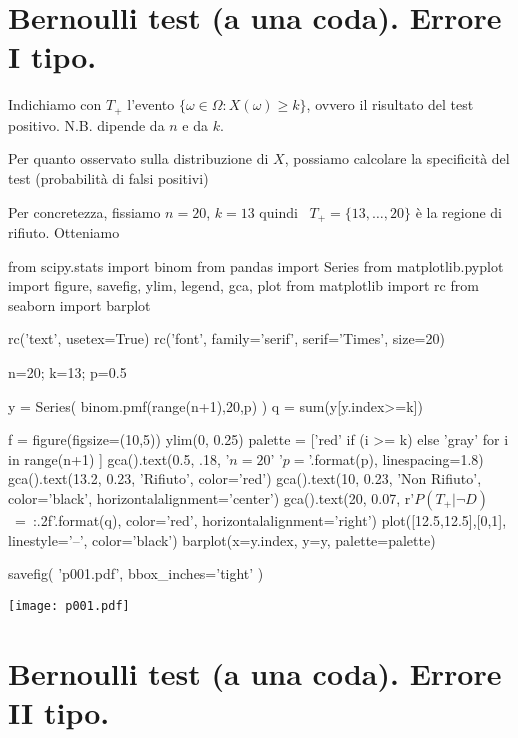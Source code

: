 \documentclass[10pt,openany]{book}
\theoremstyle{mio}
\theoremstyle{liscio}
\begin{document}
\clearpage\section{Bernoulli test (a una coda). Errore I tipo.}

Indichiamo con $T_+$ l'evento $\{\omega\in\Omega: X(\omega)\ge k\}$, ovvero il risultato del test positivo. N.B. dipende da $n$ e da $k$.

Per quanto osservato sulla distribuzione di $X$, possiamo calcolare la specificità del test (probabilità di falsi positivi)



Per concretezza, fissiamo $n=20$, $k=13$ quindi {\color{red}\boldmath\ $T_+=\{13,\dots,20\}$} è la regione di rifiuto. Otteniamo %



\begin{pycode}
from scipy.stats import binom
from pandas import Series
from matplotlib.pyplot import figure, savefig, ylim, legend, gca, plot
from matplotlib import rc
from seaborn import barplot

rc('text', usetex=True)
rc('font', family='serif', serif='Times', size=20)


n=20; k=13; p=0.5

y = Series( binom.pmf(range(n+1),20,p) )
q = sum(y[y.index>=k])

f = figure(figsize=(10,5))
ylim(0, 0.25)
palette = ['red' if (i >= k) else 'gray' for i in range(n+1) ]
gca().text(0.5, .18, '$n=20$\n' '$p={}$'.format(p), linespacing=1.8)
gca().text(13.2, 0.23, 'Rifiuto', color='red')
gca().text(10, 0.23, 'Non Rifiuto', color='black', horizontalalignment='center')
gca().text(20, 0.07, r'$P(T_+|\neg D)$\ =\ {:.2f}'.format(q), color='red', horizontalalignment='right')
plot([12.5,12.5],[0,1], linestyle='--', color='black')
barplot(x=y.index, y=y, palette=palette)

savefig( 'p001.pdf', bbox_inches='tight' )
\end{pycode}
\hfil\texttt{[image: p001.pdf]}


\clearpage\section{Bernoulli test (a  una coda). Errore II tipo.}
\end{document}
